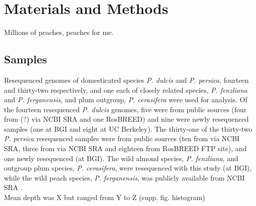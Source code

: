 \documentclass[12pt]{article}
\begin{document}


\section*{Materials and Methods}
Millions of peaches, peaches for me.

\subsection*{Samples}
Resequenced genomes of domesticated species \emph{P. dulcis} and \emph{P. persica}, fourteen and thirty-two respectively, and one each of closely related species, \emph{P. fenzliana} and \emph{P. ferganensis}, and plum outgroup, \emph{P. cerasifera} were used for analysis. 
Of the fourteen resequenced \emph{P. dulcis} genomes, five were from public sources (four from \citealt{koepke2013comparative}(?) via NCBI SRA and one RosBREED) and nine were newly resequenced samples (one at BGI and eight at UC Berkeley). 
The thirty-one of the thirty-two \emph{P. persica} resequenced samples were from public sources (ten from \citealt{verde2013high} via NCBI SRA, three from \citealt{ahmad2011whole} via NCBI SRA and eighteen from RosBREED FTP site), and one newly resequenced (at BGI). 
The wild almond species, \emph{P. fenzliana}, and outgroup plum species, \emph{P. cerasifera}, were resequenced with this study (at BGI), while the wild peach species, \emph{P. ferganensis}, was publicly available from NCBI SRA \citep{verde2013high}.\\


Mean depth was X but ranged from Y to Z (supp. fig. histogram)
\end{document}
